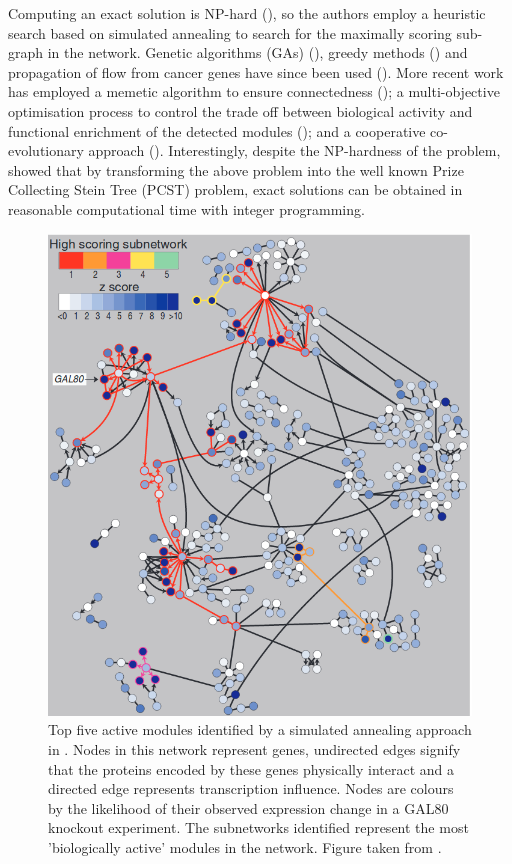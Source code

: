 \documentclass[
11pt, %
english, %
singlespacing, %
headsepline, %
]{MastersDoctoralThesis} %
\begin{document}
Computing an exact solution is NP-hard (\cite{ideker2002discovering}), so the authors employ a heuristic search based on simulated annealing to search for the maximally scoring sub-graph in the network. Genetic algorithms (GAs) (\cite{Klammer2010}), greedy methods (\cite{nacu2007gene}) and propagation of flow from cancer genes have since been used (\cite{vandin2011algorithms}). More recent work has employed a memetic algorithm to ensure connectedness (\cite{li2017active}); a multi-objective optimisation process to control the trade off between biological activity and functional enrichment of the detected modules (\cite{chen2017prior}); and a cooperative co-evolutionary approach (\cite{he2016cooperative}). Interestingly, despite the NP-hardness of the problem, \cite{dittrich2008identifying} showed that by transforming the above problem into the well known Prize Collecting Stein Tree (PCST) problem, exact solutions can be obtained in reasonable computational time with integer programming.

\begin{figure}
	\centering
	\includegraphics[width=\textwidth]{figures/ideker}
	\caption[Identified active modules in GAL80 knowckout experiment]{Top five active modules identified by a simulated annealing approach in \cite{ideker2002discovering}. Nodes in this network represent genes, undirected edges signify that the proteins encoded by these genes physically interact and a directed edge represents transcription influence. Nodes are colours by the likelihood of their observed expression change in a GAL80 knockout experiment. The subnetworks identified represent the most 'biologically active' modules in the network. Figure taken from \cite{ideker2002discovering}.}
\end{figure}
\end{document}
